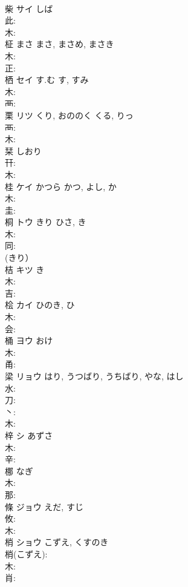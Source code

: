 \documentclass[8pt]{extreport}
\begin{document}
\begin{CJK}{UTF8}{min}
\\	柴	サイ	しば		
\\	此: 
\\	木: 
\\	柾	まさ	まさ, まさめ, まさき		
\\	木: 
\\	正: 
\\	栖	セイ	す.む	す, すみ	
\\	木: 
\\	襾: 
\\	栗	リツ	くり, おののく	くる, りっ	
\\	襾: 
\\	木: 
\\	栞		しおり				
\\	幵: 
\\	木: 
\\	桂	ケイ	かつら	かつ, よし, か	
\\	木: 
\\	圭: 
\\	桐	トウ	きり	ひさ, き	
\\	木: 
\\	同: 
\\	(きり）
\\	桔	キツ		き	
\\	木: 
\\	吉: 
\\	桧	カイ	ひのき, ひ		
\\	木: 
\\	会: 
\\	桶	ヨウ	おけ		
\\	木: 
\\	甬: 
\\	梁	リョウ	はり, うつばり, うちばり, やな, はし		
\\	水: 
\\	刀: 
\\	丶: 
\\	木: 
\\	梓	シ	あずさ		
\\	木: 
\\	辛: 
\\	梛		なぎ				
\\	木: 
\\	那: 
\\	條	ジョウ	えだ, すじ		
\\	攸: 
\\	木: 
\\	梢	ショウ	こずえ, くすのき		
\\	梢(こずえ): 
\\	木: 
\\	肖: 

\end{CJK}
\end{document}
